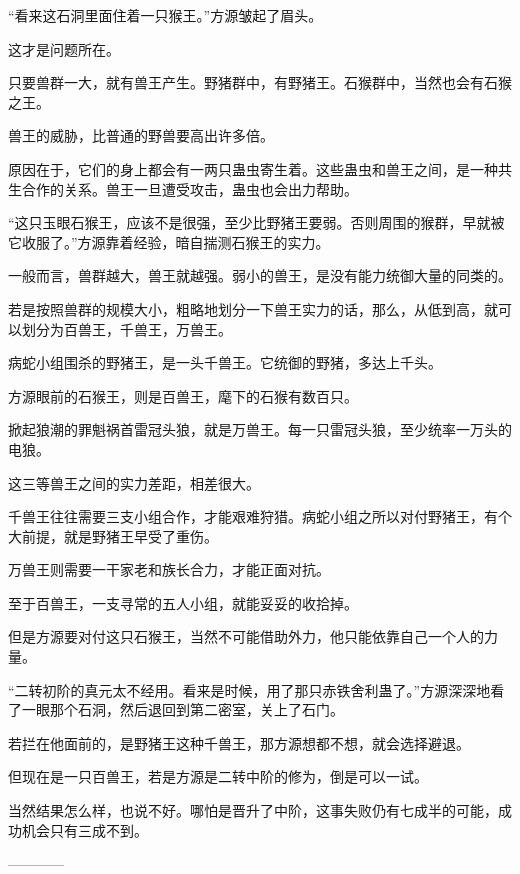 \begin{this_body}
“看来这石洞里面住着一只猴王。”方源皱起了眉头。

这才是问题所在。

只要兽群一大，就有兽王产生。野猪群中，有野猪王。石猴群中，当然也会有石猴之王。

兽王的威胁，比普通的野兽要高出许多倍。

原因在于，它们的身上都会有一两只蛊虫寄生着。这些蛊虫和兽王之间，是一种共生合作的关系。兽王一旦遭受攻击，蛊虫也会出力帮助。

“这只玉眼石猴王，应该不是很强，至少比野猪王要弱。否则周围的猴群，早就被它收服了。”方源靠着经验，暗自揣测石猴王的实力。

一般而言，兽群越大，兽王就越强。弱小的兽王，是没有能力统御大量的同类的。

若是按照兽群的规模大小，粗略地划分一下兽王实力的话，那么，从低到高，就可以划分为百兽王，千兽王，万兽王。

病蛇小组围杀的野猪王，是一头千兽王。它统御的野猪，多达上千头。

方源眼前的石猴王，则是百兽王，麾下的石猴有数百只。

掀起狼潮的罪魁祸首雷冠头狼，就是万兽王。每一只雷冠头狼，至少统率一万头的电狼。

这三等兽王之间的实力差距，相差很大。

千兽王往往需要三支小组合作，才能艰难狩猎。病蛇小组之所以对付野猪王，有个大前提，就是野猪王早受了重伤。

万兽王则需要一干家老和族长合力，才能正面对抗。

至于百兽王，一支寻常的五人小组，就能妥妥的收拾掉。

但是方源要对付这只石猴王，当然不可能借助外力，他只能依靠自己一个人的力量。

“二转初阶的真元太不经用。看来是时候，用了那只赤铁舍利蛊了。”方源深深地看了一眼那个石洞，然后退回到第二密室，关上了石门。

若拦在他面前的，是野猪王这种千兽王，那方源想都不想，就会选择避退。

但现在是一只百兽王，若是方源是二转中阶的修为，倒是可以一试。

当然结果怎么样，也说不好。哪怕是晋升了中阶，这事失败仍有七成半的可能，成功机会只有三成不到。

------------

\end{this_body}

